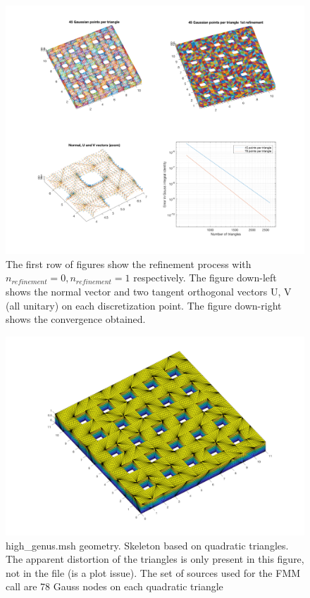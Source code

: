 \documentclass[11pt, oneside]{article}   	%
\begin{document}
\begin{figure}[H]
\begin{center}
\includegraphics[width=6in]{high_genus.pdf}
\end{center}
\caption{The first row of figures show the refinement process with $n_{refinement}=0, n_{refinement}=1$ respectively.
The figure down-left shows the normal vector and two tangent orthogonal vectors U, V (all unitary) on each discretization point. The figure down-right shows the convergence obtained. }
\label{high_genus}
\end{figure}


\begin{figure}[H]
\begin{center}
\includegraphics[width=6in]{high_genus_skeleton.pdf}
\end{center}
\caption{high\_genus.msh geometry. Skeleton based on quadratic triangles. The apparent distortion of the triangles is only present in this figure, not in the file (is a plot issue). The set of sources used for the FMM call are 78 Gauss nodes on each quadratic triangle}
\label{high_genus_skeleton}
\end{figure}
\end{document}
